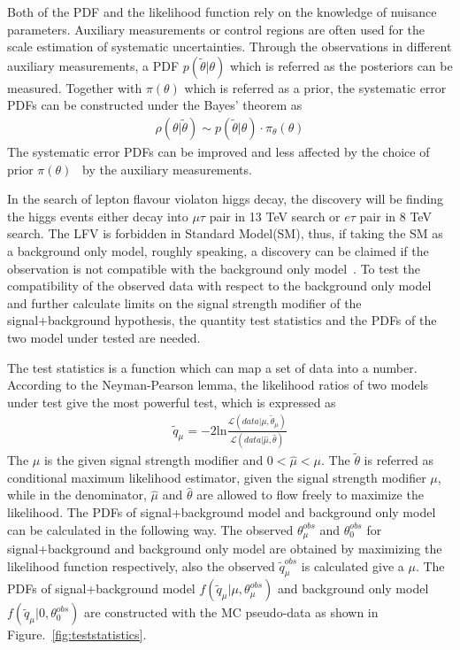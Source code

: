Both of the PDF and the likelihood function rely on the knowledge of nuisance parameters. Auxiliary measurements or control regions are often used for the scale estimation of systematic uncertainties. Through the observations in different auxiliary measurements, a PDF $p(\tilde{\theta}|\theta)$ which is referred as the posteriors can be measured. Together with $\pi(\theta)$ which is referred as a prior, the systematic error PDFs can be constructed under the Bayes' theorem as
\begin{align*}
\rho(\theta|\tilde{\theta})\sim p(\tilde{\theta}|\theta)\cdot \pi_{\theta}(\theta)
\end{align*}
The systematic error PDFs can be improved and less affected by the choice of prior $\pi(\theta)$~\cite{statistics:school2016} by the auxiliary measurements. 

In the search of lepton flavour violaton higgs decay, the discovery will be finding the higgs events either decay into $\mu\tau$ pair in 13 TeV search or $e\tau$ pair in 8 TeV search. The LFV is forbidden in Standard Model(SM), thus, if taking the SM as a background only model, roughly speaking, a discovery can be claimed if the observation is not compatible with the background only model~\cite{LHCstaticstics}. To test the compatibility of the observed data with respect to the background only model and further calculate limits on the signal strength modifier of the signal+background hypothesis, the quantity test statistics and the PDFs of the two model under tested are needed.

The test statistics is a function which can map a set of data into a number. According to the Neyman-Pearson lemma, the likelihood ratios of two models under test give the most powerful test, which is expressed as
\begin{align*}
\tilde{q}_{\mu}=-2\textrm{ln}\frac{\mathcal{L}(data|\mu,\tilde{\theta}_{\mu})}{\mathcal{L}(data|\hat{\mu},\hat{\theta})}
\end{align*}
The $\mu$ is the given signal strength modifier and $0<\hat{\mu}<\mu$. The $\tilde{\theta}$ is referred as conditional maximum likelihood estimator, given the signal strength modifier $\mu$, while in the denominator, $\hat{\mu}$ and $\hat{\theta}$ are allowed to flow freely to maximize the likelihood. The PDFs of signal+background model and background only model can be calculated in the following way. The observed $\theta^{obs}_{\mu}$ and  $\theta^{obs}_{0}$ for signal+background and background only model are obtained by maximizing the likelihood function respectively, also the observed $\tilde{q}_{\mu}^{obs}$ is calculated give a $\mu$. The PDFs of signal+background model $f(\tilde{q}_{\mu}|\mu,\theta^{obs}_{\mu})$ and background only model $f(\tilde{q}_{\mu}|0,\theta^{obs}_{0})$ are constructed with the MC pseudo-data as shown in Figure.~\ref{fig:teststatistics}.

